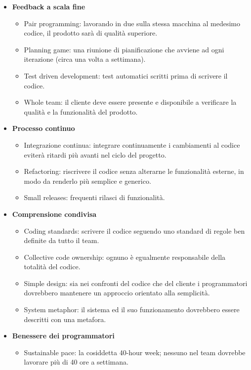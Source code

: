 \documentclass[12pt]{article}
\begin{document}
\begin{itemize}
\item \textbf{Feedback a scala fine}
	\begin{itemize}
	\item Pair programming: lavorando in due sulla stessa macchina al medesimo codice, il prodotto sarà di qualità superiore.
	\item Planning game: una riunione di pianificazione che avviene ad ogni iterazione (circa una volta a settimana).
	\item Test driven development: test automatici scritti prima di scrivere il codice.
	\item Whole team: il cliente deve essere presente e disponibile a verificare la qualità e la funzionalità del prodotto.
	\end{itemize}
\item \textbf{Processo continuo}
	\begin{itemize}
	\item Integrazione continua: integrare continuamente i cambiamenti al codice eviterà ritardi più avanti nel ciclo del progetto.
	\item Refactoring: riscrivere il codice senza alterarne le funzionalità esterne, in modo da renderlo più semplice e generico.
	\item Small releases: frequenti rilasci di funzionalità.
	\end{itemize}
\item \textbf{Comprensione condivisa}
	\begin{itemize}
	\item Coding standards: scrivere il codice seguendo uno standard di regole ben definite da tutto il team.
	\item Collective code ownership: ognuno è egualmente responsabile della totalità del codice.
	\item Simple design: sia nei confronti del codice che del cliente i programmatori dovrebbero mantenere un approccio orientato alla semplicità.
	\item System metaphor: il sistema ed il suo funzionamento dovrebbero essere descritti con una metafora.
	\end{itemize}
\item \textbf{Benessere dei programmatori}
	\begin{itemize}
	\item Sustainable pace: la cosiddetta 40-hour week; nessuno nel team dovrebbe lavorare più di 40 ore a settimana.
	\end{itemize}
\end{itemize}
\end{document}
